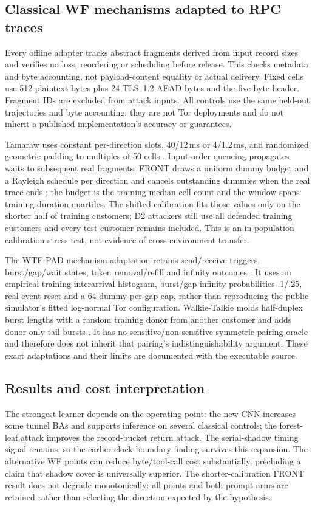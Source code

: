 \subsection{Classical WF mechanisms adapted to RPC traces}
Every offline adapter tracks abstract fragments derived from input record sizes and verifies no loss, reordering or scheduling before release. This checks metadata and byte accounting, not payload-content equality or actual delivery. Fixed cells use 512 plaintext bytes plus 24 TLS~1.2 AEAD bytes and the five-byte header. Fragment IDs are excluded from attack inputs. All controls use the same held-out trajectories and byte accounting; they are not Tor deployments and do not inherit a published implementation's accuracy or guarantees.

Tamaraw uses constant per-direction slots, 40/12\,ms or 4/1.2\,ms, and randomized geometric padding to multiples of 50 cells \cite{cai2014systematic}. Input-order queueing propagates waits to subsequent real fragments. FRONT draws a uniform dummy budget and a Rayleigh schedule per direction and cancels outstanding dummies when the real trace ends \cite{gong2020front}; the budget is the training median cell count and the window spans training-duration quartiles. The shifted calibration fits those values only on the shorter half of training customers; D2 attackers still use all defended training customers and every test customer remains included. This is an in-population calibration stress test, not evidence of cross-environment transfer.

The WTF-PAD mechanism adaptation retains send/receive triggers, burst/gap/wait states, token removal/refill and infinity outcomes \cite{juarez2016wtfpad}. It uses an empirical training interarrival histogram, burst/gap infinity probabilities .1/.25, real-event reset and a 64-dummy-per-gap cap, rather than reproducing the public simulator's fitted log-normal Tor configuration. Walkie-Talkie molds half-duplex burst lengths with a random training donor from another customer and adds donor-only tail bursts \cite{wang2017walkietalkie}. It has no sensitive/non-sensitive symmetric pairing oracle and therefore does not inherit that pairing's indistinguishability argument. These exact adaptations and their limits are documented with the executable source.

\subsection{Results and cost interpretation}
The strongest learner depends on the operating point: the new CNN increases some tunnel BAs and supports inference on several classical controls; the forest-leaf attack improves the record-bucket return attack. The serial-shadow timing signal remains, so the earlier clock-boundary finding survives this expansion. The alternative WF points can reduce byte/tool-call cost substantially, precluding a claim that shadow cover is universally superior. The shorter-calibration FRONT result does not degrade monotonically: all points and both prompt arms are retained rather than selecting the direction expected by the hypothesis.

